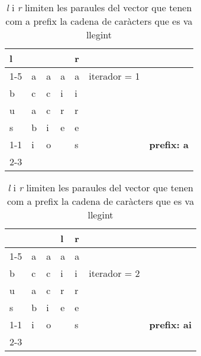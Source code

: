 \documentclass[titlepage]{article}
\begin{document}
\begin{table}[H]
\begin{center}
\begin{tabular}{lllllll}
l                       &                        &                        &                        & r                      &          &                     \\ \cline{1-5}
\multicolumn{1}{|l|}{a} & \multicolumn{1}{l|}{a} & \multicolumn{1}{l|}{a} & \multicolumn{1}{l|}{a} & \multicolumn{1}{l|}{a} & iterador = 1 &                     \\
\multicolumn{1}{|l|}{b} & \multicolumn{1}{l|}{c} & \multicolumn{1}{l|}{c} & \multicolumn{1}{l|}{i} & \multicolumn{1}{l|}{i} &          &                     \\
\multicolumn{1}{|l|}{u} & \multicolumn{1}{l|}{a} & \multicolumn{1}{l|}{c} & \multicolumn{1}{l|}{r} & \multicolumn{1}{l|}{r} &          &                     \\
\multicolumn{1}{|l|}{s} & \multicolumn{1}{l|}{b} & \multicolumn{1}{l|}{i} & \multicolumn{1}{l|}{e} & \multicolumn{1}{l|}{e} &          &                     \\ \cline{1-1} \cline{4-4}
\multicolumn{1}{l|}{}   & \multicolumn{1}{l|}{i} & \multicolumn{1}{l|}{o} & \multicolumn{1}{l|}{}  & \multicolumn{1}{l|}{s} &          & \textbf{prefix: a} \\ \cline{2-3} \cline{5-5}
\end{tabular}
\end{center}
\begin{center}
\begin{tabular}{lllllll}
                        &                        &                        & l                      & r                      &          &                      \\ \cline{1-5}
\multicolumn{1}{|l|}{a} & \multicolumn{1}{l|}{a} & \multicolumn{1}{l|}{a} & \multicolumn{1}{l|}{a} & \multicolumn{1}{l|}{a} &          &                      \\
\multicolumn{1}{|l|}{b} & \multicolumn{1}{l|}{c} & \multicolumn{1}{l|}{c} & \multicolumn{1}{l|}{i} & \multicolumn{1}{l|}{i} & iterador = 2 &                      \\
\multicolumn{1}{|l|}{u} & \multicolumn{1}{l|}{a} & \multicolumn{1}{l|}{c} & \multicolumn{1}{l|}{r} & \multicolumn{1}{l|}{r} &          &                      \\
\multicolumn{1}{|l|}{s} & \multicolumn{1}{l|}{b} & \multicolumn{1}{l|}{i} & \multicolumn{1}{l|}{e} & \multicolumn{1}{l|}{e} &          &                      \\ \cline{1-1} \cline{4-4}
\multicolumn{1}{l|}{}   & \multicolumn{1}{l|}{i} & \multicolumn{1}{l|}{o} & \multicolumn{1}{l|}{}  & \multicolumn{1}{l|}{s} &          & \textbf{prefix: ai} \\ \cline{2-3} \cline{5-5}
\end{tabular}

            \caption{\textit{l} i \textit{r} limiten les paraules del vector que tenen com a prefix la cadena de caràcters que es va llegint}
            \label{fig:sortedVector2}
\end{center}
\end{table}
\end{document}
